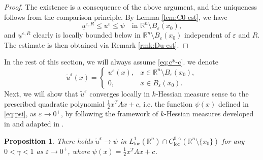 \documentclass[reqno]{amsart}
\newtheorem{proposition}[theorem]{Proposition}
\theoremstyle{remark}
\theoremstyle{definition}
\numberwithin{equation}{section}
\begin{document}
\begin{proof}
	The existence is a consequence of the above argument, and the uniqueness follows from the comparison principle. By Lemma \ref{lem:C0-est}, we have
	\begin{equation}\label{eq:u-e-C0}
		\underline{u}^{\varepsilon,R}\leq u^\varepsilon\leq\psi\quad\text{in }\mathbb{R}^n\setminus B_\varepsilon(x_0),
	\end{equation}
	 and $\underline{u}^{\varepsilon,R}$ clearly is locally bounded below in $\mathbb{R}^n\setminus B_\varepsilon(x_0)$ independent of $\varepsilon$ and $R$. The estimate is then obtained via Remark \ref{rmk:Du-est}.
\end{proof}

In the rest of this section, we will always assume \eqref{eq:c*-c}. we denote   
\begin{equation*}
	\tilde{u}^\varepsilon(x)=
	\begin{cases}
		u^\varepsilon(x), & x\in\mathbb{R}^n\setminus B_\varepsilon(x_0), \\
		0, & x\in B_\varepsilon(x_0).
	\end{cases}
\end{equation*}
Next, we will show that $\tilde{u}^\varepsilon$ converges locally in $k$-Hessian measure sense to the prescribed quadratic polynomial $\frac{1}{2}x^TAx+c$, i.e. the function $\psi(x)$ defined in \eqref{eq:psi}, as $\varepsilon\to0^+$, by following the framework of $k$-Hessian measures developed in \cite{Trudinger-Wang-II, Trudinger-Wang-III} and adapted in \cite{Wang-Xiao}.
\begin{proposition}\label{prop:limit}
	There holds $\tilde{u}^\varepsilon\to\psi$ in $L^1_{\mathrm{loc}}(\mathbb{R}^n)\cap C^{0,\gamma}_{\mathrm{loc}}(\mathbb{R}^n\setminus\{x_0\})$ for any $0<\gamma<1$ as $\varepsilon\to0^+$, where $\psi(x)=\frac{1}{2}x^TAx+c$. 
\end{proposition}

\end{document}
